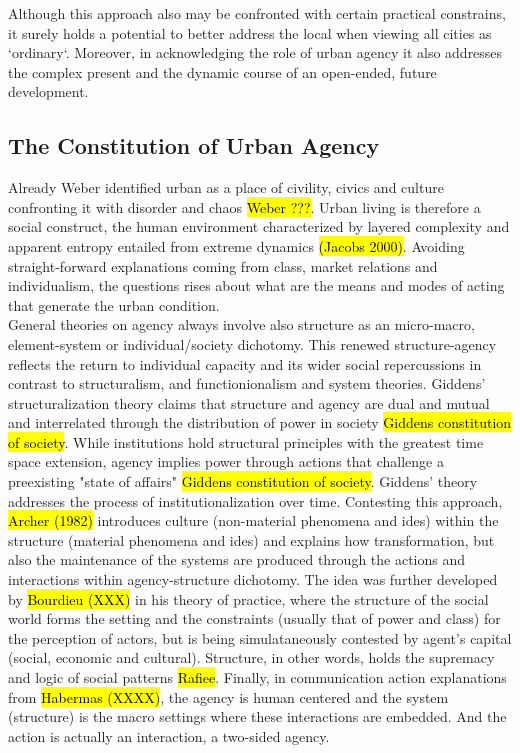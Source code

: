\documentclass[11pt]{report}
\begin{document}
Although this approach also may  be  confronted  with  certain practical constrains, it surely holds a potential to better address the local when viewing all cities as ‘ordinary‘. Moreover, in acknowledging the role of urban agency it also addresses the complex present and the dynamic course of an open-ended, future development. 

\subsection{The Constitution of Urban Agency}

Already Weber identified  urban as a place of civility, civics and culture confronting it with disorder and chaos \hl{Weber ???}. Urban living is therefore a social construct, the human environment characterized by layered complexity and apparent entropy entailed from extreme dynamics \hl{(Jacobs 2000)}.
Avoiding straight-forward explanations coming from class, market relations and  individualism, the questions rises about what are the means and modes of acting that generate the urban condition.
\\
General theories on agency always involve also structure as an micro-macro, element-system or individual/society dichotomy. This renewed structure-agency reflects the return to individual capacity and its wider social repercussions in contrast to structuralism, and functionionalism and system theories.
Giddens' structuralization theory claims that structure and agency are dual and mutual and interrelated through the distribution of power in society \hl{Giddens constitution of society}. While institutions hold structural principles with the greatest time space extension, agency implies power through actions that challenge a preexisting "state of affairs" \hl{Giddens constitution of society}. Giddens' theory addresses the process of institutionalization over time. Contesting this approach, \hl{Archer (1982)} introduces culture (non-material phenomena and ides) within the structure (material phenomena and ides) and explains how transformation, but also the maintenance of the systems are produced through the actions and interactions within agency-structure dichotomy. The idea was further developed by \hl{Bourdieu (XXX)} in his theory of practice, where the structure of the social world forms the setting and the constraints (usually that of power and class) for the perception of actors, but is being simulataneously contested by agent's capital (social, economic and cultural). Structure, in other words, holds the supremacy and logic of social patterns \hl{Rafiee}. Finally, in communication action explanations from \hl{Habermas (XXXX)}, the agency is human centered and the system (structure) is the macro settings where these interactions are embedded. And the action is actually an interaction, a two-sided agency.
\end{document}

